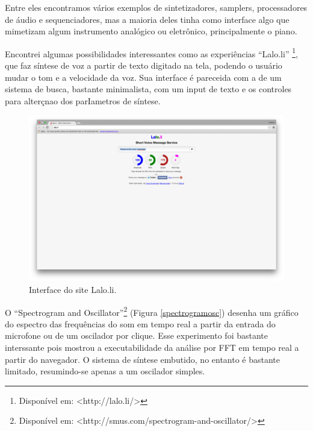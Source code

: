 Entre eles encontramos vários exemplos de sintetizadores, samplers, processadores de áudio e sequenciadores, mas a maioria deles tinha como interface algo que mimetizam algum instrumento analógico ou eletrônico, principalmente o piano.

Encontrei algumas possibilidades interessantes como as experiências ``Lalo.li'' \footnote{Disponível em: <http://lalo.li/> }, que faz síntese de voz a partir de texto digitado na tela, podendo o usuário mudar o tom e a velocidade da voz. Sua interface é pareceida com a de um sistema de busca, bastante minimalista, com um input de texto e os controles para alterçnao dos parIametros de síntese.

\begin{figure}
    \caption{\label{laloli}Interface do site Lalo.li.}
    
        \includegraphics[width=1\linewidth]{pictures/cap2/laloli}
    
\end{figure}

O ``Spectrogram and Oscillator''\footnote{Disponível em: <http://smus.com/spectrogram-and-oscillator/>} (Figura \ref{spectrogramosc}) desenha um gráfico do espectro das frequências do som em tempo real a partir da entrada do microfone ou de um oscilador por clique. Esse experimento foi bastante interssante pois mostrou a executabilidade da análise por FFT em tempo real a partir do navegador. O sistema de síntese embutido, no entanto é bastante limitado, resumindo-se apenas a um oscilador simples.   



